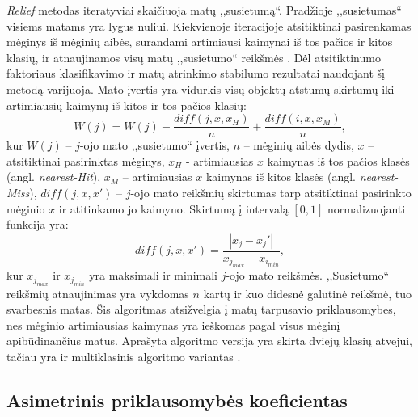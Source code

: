 \textit{Relief} metodas iteratyviai skaičiuoja matų ,,susietumą``. Pradžioje ,,susietumas`` visiems matams yra lygus nuliui. Kiekvienoje iteracijoje atsitiktinai pasirenkamas mėginys iš mėginių aibės, surandami artimiausi kaimynai iš tos pačios ir kitos klasių, ir atnaujinamos visų matų ,,susietumo`` reikšmės \cite{DBLP:journals/ml/Robnik-SikonjaK03}. Dėl atsitiktinumo faktoriaus klasifikavimo ir  matų atrinkimo stabilumo rezultatai naudojant šį metodą varijuoja. Mato įvertis yra vidurkis visų objektų atstumų skirtumų iki artimiausių kaimynų iš kitos ir tos pačios klasių:
\begin{equation}
 W(j)=W(j) - \frac{diff(j, x, x_H)}{n} + \frac{diff(i, x, x_M)}{n},
\end{equation}
kur 
$W(j)$ -- $j$-ojo mato ,,susietumo`` įvertis, 
$n$ -- mėginių aibės dydis, 
$x$ -- atsitiktinai pasirinktas mėginys, 
$x_H$ - artimiausias $x$ kaimynas iš tos pačios klasės (angl. \textit{nearest-Hit}), 
$x_M$ -- artimiausias $x$ kaimynas iš kitos klasės (angl. \textit{nearest-Miss}),
$diff(j, x, x')$ -- $j$-ojo mato reikšmių skirtumas tarp atsitiktinai pasirinkto mėginio $x$ ir atitinkamo jo kaimyno. Skirtumą į intervalą $[0, 1]$ normalizuojanti funkcija yra:
\begin{equation}
 diff(j, x, x')=\frac{|x_j- x_j'|}{x_{j_{max}} - x_{i_{min}}},
\end{equation}
kur $x_{j_{max}}$ ir $x_{j_{min}}$ yra maksimali ir minimali $j$-ojo mato reikšmės. ,,Susietumo`` reikšmių atnaujinimas yra vykdomas $n$ kartų ir kuo didesnė galutinė reikšmė, tuo svarbesnis matas. Šis algoritmas atsižvelgia į matų tarpusavio priklausomybes, nes mėginio artimiausias kaimynas yra ieškomas pagal visus mėginį apibūdinančius matus. Aprašyta algoritmo versija yra skirta dviejų klasių atvejui, tačiau yra ir multiklasinis algoritmo variantas \cite{DBLP:journals/ml/Robnik-SikonjaK03}.

\subsection{Asimetrinis priklausomybės koeficientas}

